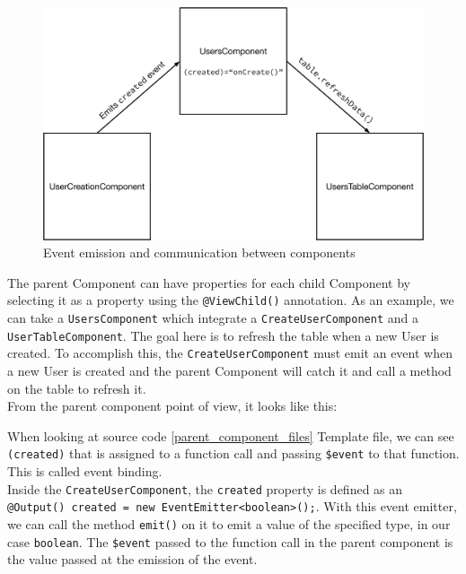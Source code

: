 \documentclass[twoside, openright,11pt,a4paper]{book}
\newenvironment{code}{\captionsetup{type=listing}}{}
\begin{document}
\begin{figure}[H]
\begin{center}
	\includegraphics[width=.8\textwidth]{assets/componentsComm}
	\caption{Event emission and communication between components}
	\label{communication_figure}
\end{center}
\end{figure}

The parent Component can have properties for each child Component by selecting it as a property using the \verb+@ViewChild()+ annotation. As an example, we can take a \verb+UsersComponent+ which integrate a \verb+CreateUserComponent+ and a \verb+UserTableComponent+. The goal here is to refresh the table when a new User is created. To accomplish this, the \verb+CreateUserComponent+ must emit an event when a new User is created and the parent Component will catch it and call a method on the table to refresh it. \\

From the parent component point of view, it looks like this:
\begin{code}
	\caption{Template and logic files of the parent component}
	\label{parent_component_files}
\end{code}
When looking at source code \ref{parent_component_files} Template file, we can see \verb+(created)+ that is assigned to a function call and passing \verb+$event+ to that function. This is called event binding.\\

Inside the \verb+CreateUserComponent+, the \verb+created+ property is defined as an \\\texttt{@Output() created = new EventEmitter<boolean>();}. With this event emitter, we can call the method \verb+emit()+ on it to emit a value of the specified type, in our case \verb+boolean+. The \verb+$event+ passed to the function call in the parent component is the value passed at the emission of the event.
\end{document}
